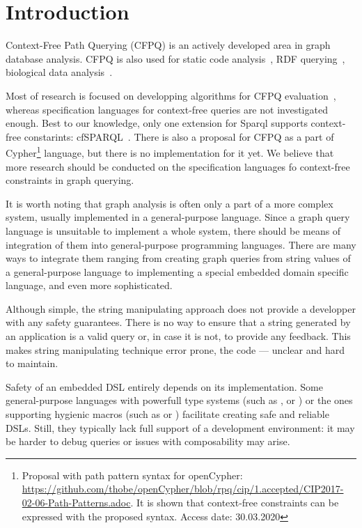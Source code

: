 \section{Introduction}

Context-Free Path Querying (CFPQ) is an actively developed area in graph database analysis.
CFPQ is also used for static code analysis~\cite{Reps,10.1145/193173.195287,Zheng}, RDF querying~\cite{10.1007/978-3-319-46523-4_38,MEDEIROS201975}, biological data analysis~\cite{cfpqBio}.

Most of research is focused on developping algorithms for CFPQ evaluation~\cite{hellingsRelational,ward2008distributed,cfpqBio,MEDEIROS201975,Azimov:2018:CPQ:3210259.3210264,Grigorev:2017:CPQ:3166094.3166104}, whereas specification languages for context-free queries are not investigated enough.
Best to our knowledge, only one extension for Sparql supports context-free constarints: cfSPARQL~\cite{10.1007/978-3-319-46523-4_38}.
There is also a proposal for CFPQ as a part of Cypher\footnote{Proposal with path pattern syntax for openCypher: \url{https://github.com/thobe/openCypher/blob/rpq/cip/1.accepted/CIP2017-02-06-Path-Patterns.adoc}.
It is shown that context-free constraints can be expressed with the proposed syntax. Access date: 30.03.2020} language, but there is no implementation for it yet.
We believe that more research should be conducted on the specification languages fo context-free constraints in graph querying.

It is worth noting that graph analysis is often only a part of a more complex system, usually implemented in a general-purpose language.
Since a graph query language is unsuitable to implement a whole system, there should be means of integration of them into general-purpose programming languages.
There are many ways to integrate them ranging from creating graph queries from string values of a general-purpose language to implementing a special embedded domain specific language, and even more sophisticated.

Although simple, the string manipulating approach does not provide a developper with any safety guarantees.
There is no way to ensure that a string generated by an application is a valid query or, in case it is not, to provide any feedback.
This makes string manipulating technique error prone, the code --- unclear and hard to maintain.

Safety of an embedded DSL entirely depends on its implementation.
Some general-purpose languages with powerfull type systems (such as \haskell{}, \ocaml{} or \scala{}) or the ones supporting hygienic macros (such as \scheme{} or \rust{}) facilitate creating safe and reliable DSLs.
Still, they typically lack full support of a development environment: it may be harder to debug queries or issues with composability may arise.

